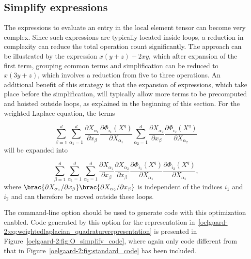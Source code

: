 \subsection{Simplify expressions}
\label{oelgaard-2:sec:simplify_expressions}

The expressions to evaluate an entry in the local element tensor can
become very complex. Since such expressions are typically located
inside loops, a reduction in complexity can reduce the total operation
count significantly.  The approach can be illustrated by the
expression $x (y + z) + 2 x y$, which after expansion of the first
term, grouping common terms and simplification can be reduced to $x (3
y + z)$, which involves a reduction from five to three operations.  An
additional benefit of this strategy is that the expansion of
expressions, which take place before the simplification, will
typically allow more terms to be precomputed and hoisted outside
loops, as explained in the beginning of this section.  For the
weighted Laplace equation, the terms

\begin{equation}
  \sum_{\beta=1}^d
  \sum_{\alpha_1=1}^d
    \frac{\partial X_{\alpha_1}}{\partial x_{\beta}}
    \frac{\partial \Phi_{i_1}(X^q)}{\partial X_{\alpha_1}}
  \sum_{\alpha_2=1}^d
    \frac{\partial X_{\alpha_2}}{\partial x_{\beta}}
    \frac{\partial \Phi_{i_2}(X^q)}{\partial X_{\alpha_2}}
\end{equation}
%
will be expanded into

\begin{equation}
  \sum_{\beta=1}^d
  \sum_{\alpha_1=1}^d
  \sum_{\alpha_2=1}^d
  \frac{\partial X_{\alpha_1}}{\partial x_{\beta}}
  \frac{\partial X_{\alpha_2}}{\partial x_{\beta}}
  \frac{\partial \Phi_{i_1}(X^q)}{\partial X_{\alpha_1}}
  \frac{\partial \Phi_{i_2}(X^q)}{\partial X_{\alpha_2}},
\end{equation}
%
where $\brac{\partial X_{\alpha_1} / \partial x_{\beta}}
\brac{\partial X_{\alpha_2} / \partial x_{\beta}}$ is independent of
the indices $i_1$ and $i_2$ and can therefore be moved outside these
loops.

The \ffc{} command-line option  should
be used to generate code with this optimization enabled.  Code
generated by this option for the representation
in~\eqref{oelgaard-2:eq:weightedlaplacian_quadraturerepresentation} is
presented in Figure~\ref{oelgaard-2:fig:O_simplify_code}, where again
only code different from that in
Figure~\ref{oelgaard-2:fig:standard_code} has been included.

